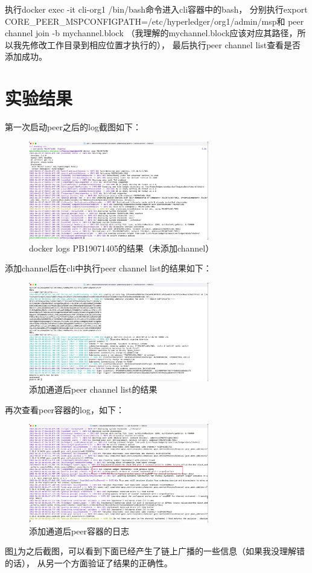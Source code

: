 \documentclass{article}
\begin{document}
    执行{\jetbrains docker exec -it cli-org1 /bin/bash}命令进入{\jetbrains cli}容器中的{\jetbrains bash}，
    分别执行{\jetbrains export CORE\_PEER\_MSPCONFIGPATH=/etc/hyperledger/org1/admin/msp}和
    {\jetbrains peer channel join -b mychannel.block}
    （我理解的{\jetbrains mychannel.block}应该对应其路径，所以我先修改工作目录到相应位置才执行的），
    最后执行{\jetbrains peer channel list}查看是否添加成功。
    \section{实验结果}
    第一次启动peer之后的log截图如下：
    \begin{figure}[H]
        \centering
        \includegraphics[width=0.7\textwidth]{./figs/start_peer.jpg}
        \caption{\jetbrains docker logs PB19071405的结果（未添加channel）}
    \end{figure}
    添加channel后在{\jetbrains cli}中执行{\jetbrains peer channel list}的结果如下：
    \begin{figure}[H]
        \centering
        \includegraphics[width=0.7\textwidth]{./figs/join_channel1.jpg}
        \caption{\jetbrains 添加通道后peer channel list的结果}
    \end{figure}
    再次查看peer容器的log，如下：
    \begin{figure}[H]
        \centering
        \includegraphics[width=0.7\textwidth]{./figs/join_channel2.jpg}
        \caption{添加通道后peer容器的日志}
        \label{join_channel2}
    \end{figure}
    图\ref{join_channel2}为之后截图，可以看到下面已经产生了链上广播的一些信息（如果我没理解错的话），
    从另一个方面验证了结果的正确性。
\end{document}

